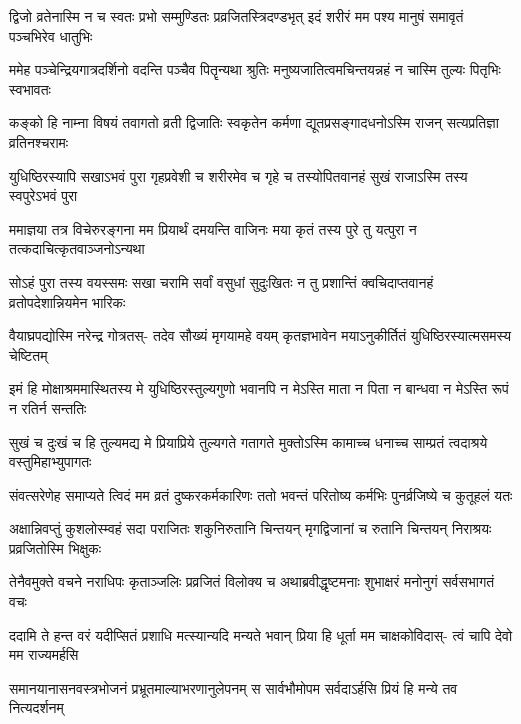 \fourlineindentedshloka
{द्विजो व्रतेनास्मि न च स्वतः प्रभो}
{सम्मुण्डितः प्रव्रजितस्त्रिदण्डभृत्}
{इदं शरीरं मम पश्य मानुषं}
{समावृतं पञ्चभिरेव धातुभिः}


\fourlineindentedshloka
{ममेह पञ्चेन्द्रियगात्रदर्शिनो}
{वदन्ति पञ्चैव पितॄन्यथा श्रुतिः}
{मनुष्यजातित्वमचिन्तयन्नहं}
{न चास्मि तुल्यः पितृभिः स्वभावतः}


\fourlineindentedshloka
{कङ्को हि नाम्ना विषयं तवागतो}
{व्रती द्विजातिः स्वकृतेन कर्मणा}
{द्यूतप्रसङ्गादधनोऽस्मि राजन्}
{सत्यप्रतिज्ञा व्रतिनश्चरामः}


\fourlineindentedshloka
{युधिष्ठिरस्यापि सखाऽभवं पुरा}
{गृहप्रवेशी च शरीरमेव च}
{गृहे च तस्योपितवानहं सुखं}
{राजाऽस्मि तस्य स्वपुरेऽभवं पुरा}


\fourlineindentedshloka
{ममाज्ञया तत्र विचेरुरङ्गना}
{मम प्रियार्थं दमयन्ति वाजिनः}
{मया कृतं तस्य पुरे तु यत्पुरा}
{न तत्कदाचित्कृतवाञ्जनोऽन्यथा}


\fourlineindentedshloka
{सोऽहं पुरा तस्य वयस्समः सखा}
{चरामि सर्वां वसुधां सुदुःखितः}
{न तु प्रशान्तिं क्वचिदाप्तवानहं}
{व्रतोपदेशान्नियमेन भारिकः}


\fourlineindentedshloka
{वैयाघ्रपद्योस्मि नरेन्द्र गोत्रतस्-}
{तदेव सौख्यं मृगयामहे वयम्}
{कृतज्ञभावेन मयाऽनुकीर्तितं}
{युधिष्ठिरस्यात्मसमस्य चेष्टितम्}


\fourlineindentedshloka
{इमं हि मोक्षाश्रममास्थितस्य मे}
{युधिष्ठिरस्तुल्यगुणो भवानपि}
{न मेऽस्ति माता न पिता न बान्धवा}
{न मेऽस्ति रूपं न रतिर्न सन्ततिः}


\fourlineindentedshloka
{सुखं च दुःखं च हि तुल्यमद्य मे}
{प्रियाप्रिये तुल्यगते गतागते}
{मुक्तोऽस्मि कामाच्च धनाच्च साम्प्रतं}
{त्वदाश्रये वस्तुमिहाभ्युपागतः}


\fourlineindentedshloka
{संवत्सरेणेह समाप्यते त्विदं}
{मम व्रतं दुष्करकर्मकारिणः}
{ततो भवन्तं परितोष्य कर्मभिः}
{पुनर्व्रजिष्ये च कुतूहलं यतः}


\fourlineindentedshloka
{अक्षान्निवप्तुं कुशलोस्म्वहं सदा}
{पराजितः शकुनिरुतानि चिन्तयन्}
{मृगद्विजानां च रुतानि चिन्तयन्}
{निराश्रयः प्रव्रजितोस्मि भिक्षुकः}



\fourlineindentedshloka
{तेनैवमुक्ते वचने नराधिपः}
{कृताञ्जलिः प्रव्रजितं विलोक्य च}
{अथाब्रवीद्धृष्टमनाः शुभाक्षरं}
{मनोनुगं सर्वसभागतं वचः}


\fourlineindentedshloka
{ददामि ते हन्त वरं यदीप्सितं}
{प्रशाधि मत्स्यान्यदि मन्यते भवान्}
{प्रिया हि धूर्ता मम चाक्षकोविदास्-}
{त्वं चापि देवो मम राज्यमर्हसि}


\fourlineindentedshloka
{समानयानासनवस्त्रभोजनं}
{प्रभ्रूतमाल्याभरणानुलेपनम्}
{स सार्वभौमोपम सर्वदाऽर्हसि}
{प्रियं हि मन्ये तव नित्यदर्शनम्}


